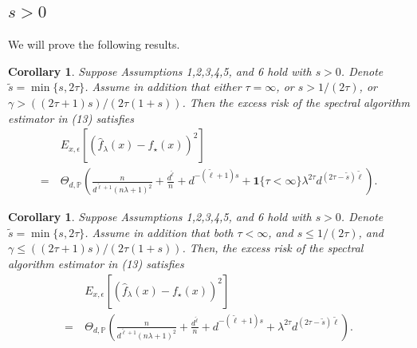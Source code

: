 \documentclass{article}
\theoremstyle{plain}
\newtheorem{corollary}[theorem]{Corollary}
\theoremstyle{definition}
\theoremstyle{remark}
\begin{document}
\begin{appendix}
% 



\subsection{$s>0$}\label{appendix_f3}

We will prove the following results.

\begin{corollary}\label{coroll_learn_curve_case_2}
Suppose Assumptions 1,2,3,4,5, and 6 hold with $s>0$. 
Denote $\tilde{s}=\min\{s, 2\tau\}$.
Assume in addition that either $\tau=\infty$, or $s>1/(2\tau)$, or $\gamma > ((2\tau+1)s) / (2\tau(1+s))$.
Then the excess risk of the spectral algorithm estimator in (13) satisfies
\begin{equation*}
\begin{aligned}
    &~E_{x, \epsilon} \left[ \left(\hat{f}_{\lambda}(x) - f_{\star}(x) \right)^{2} \right]\\
=&~ \Theta_{d, \mathbb{P}} \left( \frac{n}{d^{\tilde{\ell}+1}(n\lambda+1)^{2}} + \frac{d^{\tilde{\ell}}}{n} + 
    d^{-(\tilde{\ell}+1)s}
    +\mathbf{1}\{\tau<\infty\}\lambda^{2\tau}d^{(2\tau-\tilde{s})\tilde{\ell} }\right).
\end{aligned}
\end{equation*}
\end{corollary}


\begin{corollary}\label{coroll_learn_curve_case_2_complex}
    Suppose Assumptions 1,2,3,4,5, and 6 hold with $s>0$. 
Denote $\tilde{s}=\min\{s, 2\tau\}$.
Assume in addition that both $\tau<\infty$, and $s \leq 1/(2\tau)$, and $\gamma \leq ((2\tau+1)s) / (2\tau(1+s))$.
Then, the excess risk of the spectral algorithm estimator in (13) satisfies
\begin{equation*}
\begin{aligned}
    &~E_{x, \epsilon} \left[ \left(\hat{f}_{\lambda}(x) - f_{\star}(x) \right)^{2} \right]\\
=&~ \Theta_{d, \mathbb{P}} \left( \frac{n}{d^{\tilde{\ell}+1}(n\lambda+1)^{2}} + \frac{d^{\tilde{\ell}}}{n} + 
    d^{-(\tilde{\ell}+1)s}
    +\lambda^{2\tau}d^{(2\tau-\tilde{s})\tilde{\ell} }\right).
\end{aligned}
\end{equation*}
\end{corollary}




\end{appendix}
\end{document}
